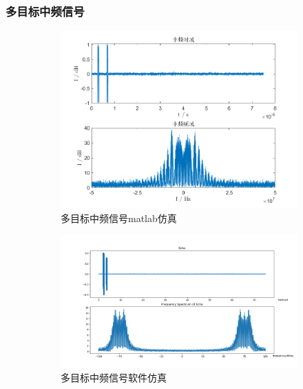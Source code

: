 \documentclass{article}
\newcounter{sub}
\begin{document}
\subsubsection{多目标中频信号}%
\label{ssub:多目标中频信号}

\begin{figure}[H]
	\centering
	\begin{subfigure}[H]{.45\linewidth}
		\centering
		\includegraphics[width=\linewidth]{two-MF-matlab.png}
		\caption{多目标中频信号matlab仿真}
		\label{fig:多目标中频信号matlab仿真}
	\end{subfigure}
	\quad
	\begin{subfigure}[H]{.45\linewidth}
		\centering
		\includegraphics[width=\linewidth]{two-MF-software.png}
		\caption{多目标中频信号软件仿真}
		\label{fig:多目标中频信号软件仿真}
	\end{subfigure}
	\quad
	\begin{subfigure}[H]{.45\linewidth}

\end{subfigure}
\end{figure}
\end{document}
